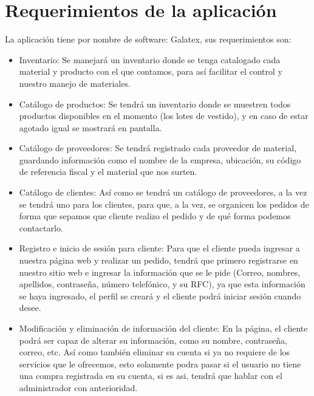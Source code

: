 \documentclass[conference]{IEEEtran}
\begin{document}
\section{Requerimientos de la aplicación}

La aplicación tiene por nombre de software: Galatex, sus requerimientos son:
		
\begin{itemize}
	\item Inventario: 
	\subitem  Se manejará un inventario donde se
	tenga catalogado cada material y
	producto con el que contamos, para así
	facilitar el control y nuestro manejo de
	materiales.
	
	\item Catálogo de productos:
	\subitem Se tendrá un inventario donde se
	muestren todos productos disponibles
	en el momento (los lotes de vestido), y
	en caso de estar agotado igual se
	mostrará en pantalla.
	
	\item Catálogo de proveedores:
	\subitem Se tendrá registrado cada proveedor de
	material, guardando información como
	el nombre de la empresa, ubicación, su
	código de referencia fiscal y el material
	que nos surten.
	\subitem
	\subitem
	
	\item Catálogo de clientes:
	\subitem Así como se tendrá un catálogo de
	proveedores, a la vez se tendrá uno
	para los clientes, para que, a la vez, se
	organicen los pedidos de forma que
	sepamos que cliente realizo el pedido y
	de qué forma podemos contactarlo.
	
	\item Registro e inicio de sesión para cliente:
	\subitem Para que el cliente pueda ingresar a
	nuestra página web y realizar un
	pedido, tendrá que primero registrarse
	en nuestro sitio web e ingresar la
	información que se le pide (Correo,
	nombres, apellidos, contraseña,
	número telefónico, y su RFC), ya que
	esta información se haya ingresado, el
	perfil se creará y el cliente podrá iniciar
	sesión cuando desee.
	
	\item Modificación y eliminación de
	información del cliente:
	\subitem En la página, el cliente podrá ser capaz
	de alterar su información, como su
	nombre, contraseña, correo, etc. Así
	como también eliminar su cuenta si ya
	no requiere de los servicios que le
	ofrecemos, esto solamente podra pasar
	si el usuario no tiene una compra
	registrada en su cuenta, si es asi,
	tendrá que hablar con el administrador
	con anterioridad.
	

\end{itemize}
\end{document}
